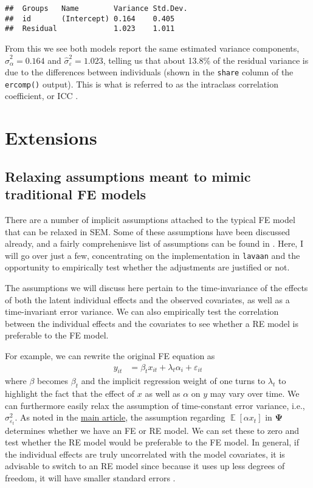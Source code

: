 \documentclass[]{interact}
\theoremstyle{plain}%
\theoremstyle{definition}
\theoremstyle{remark}
\begin{document}
\begin{verbatim}
##  Groups   Name        Variance Std.Dev.
##  id       (Intercept) 0.164    0.405   
##  Residual             1.023    1.011
\end{verbatim}

\doublespacing

From this we see both models report the same estimated variance
components, \(\hat{\sigma}^{2}_{\alpha} = 0.164\) and
\(\hat{\sigma}^{2}_{\varepsilon} = 1.023\), telling us that about 13.8\%
of the residual variance is due to the differences between individuals
(shown in the \texttt{share} column of the \texttt{ercomp()} output).
This is what is referred to as the intraclass correlation coefficient,
or ICC \citep{Hox2010}.

\hypertarget{exten}{%
\section{Extensions}\label{exten}}

\hypertarget{relax}{%
\subsection{Relaxing assumptions meant to mimic traditional FE
models}\label{relax}}

There are a number of implicit assumptions attached to the typical FE
model that can be relaxed in SEM. Some of these assumptions have been
discussed already, and a fairly comprehenisve list of assumptions can be
found in \citet{Bollen2010}. Here, I will go over just a few,
concentrating on the implementation in \texttt{lavaan} and the
opportunity to empirically test whether the adjustments are justified or
not.

The assumptions we will discuss here pertain to the time-invariance of
the effects of both the latent individual effects and the observed
covariates, as well as a time-invariant error variance. We can also
empirically test the correlation between the individual effects and the
covariates to see whether a RE model is preferable to the FE model.

For example, we can rewrite the original FE equation as \begin{align}
y_{it} & = \beta_{t}x_{it} + \lambda_{t}\alpha_{i} + \varepsilon_{it}
\end{align} where \(\beta\) becomes \(\beta_{t}\) and the implicit
regression weight of one turns to \(\lambda_{t}\) to highlight the fact
that the effect of \(x\) as well as \(\alpha\) on \(y\) may vary over
time. We can furthermore easily relax the assumption of time-constant
error variance, i.e., \(\sigma^{2}_{\varepsilon_{t}}\). As noted in the
\href{https://github.com/henrik-andersen/FE-SEM/blob/master/article.pdf}{main
article}, the assumption regarding
\(\mathop{\mathrm{\mathbb{E}}}[\alpha x_{t}]\) in \(\bm{\Psi}\)
determines whether we have an FE or RE model. We can set these to zero
and test whether the RE model would be preferable to the FE model. In
general, if the individual effects are truly uncorrelated with the model
covariates, it is advisable to switch to an RE model since because it
uses up less degrees of freedom, it will have smaller standard errors
\citep{Bollen2010}.
\end{document}
